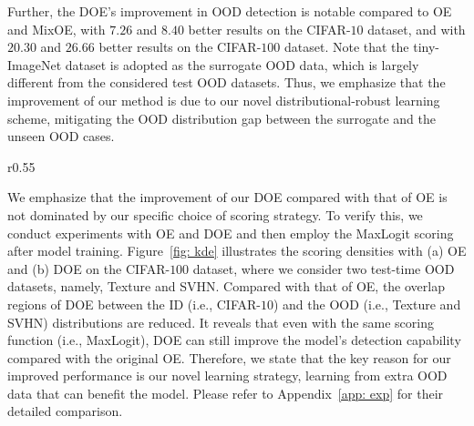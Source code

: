 \documentclass{article} \usepackage{iclr2022_conference,times}
\begin{document}
Further, the DOE's improvement in OOD detection is notable compared to OE and MixOE, with {$7.26$ and $8.40$} better results on the CIFAR-$10$ dataset, and with {$20.30$ and $26.66$} better results on the CIFAR-$100$ dataset. Note that the tiny-ImageNet dataset is adopted as the surrogate OOD data, which is largely different from the considered test OOD datasets. Thus, we emphasize that the improvement of our method is due to our novel distributional-robust learning scheme, mitigating the OOD distribution gap between the surrogate and the unseen OOD cases. 



\begin{wrapfigure}{r}{0.55\textwidth}
    \centering
    \vspace{-7pt}
    \caption{
    The scoring densities of OE and DOE on CIFAR-100 dataset, where the MaxLogit is employed. }
    \label{fig: kde}
\end{wrapfigure}

We emphasize that the improvement of our DOE compared with that of OE is not dominated by our specific choice of scoring strategy. To verify this, we conduct experiments with OE and DOE and then employ the MaxLogit scoring after model training. Figure~\ref{fig: kde} illustrates the scoring densities with (a) OE and (b) DOE on the CIFAR-$100$ dataset, where we consider two test-time OOD datasets, namely, Texture and SVHN. Compared with that of OE, the overlap regions of DOE between the ID (i.e., CIFAR-$10$) and the OOD (i.e., Texture and SVHN) distributions are reduced. It reveals that even with the same scoring function (i.e., MaxLogit), DOE can still improve the model's detection capability compared with the original OE. Therefore, we state that the key reason for our improved performance is our novel learning strategy, learning from extra OOD data that can benefit the model. Please refer to {Appendix~\ref{app: exp}} for their detailed comparison. 
\end{document}

